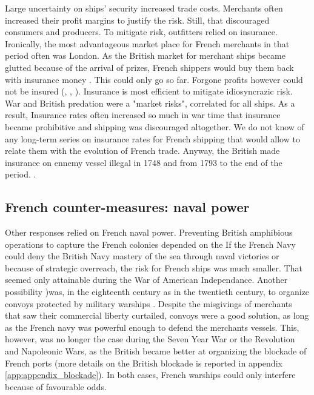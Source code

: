 \documentclass[12pt,a4paper,notitlepage,english]{article}
\begin{document}
Large uncertainty on ships’ security increased trade costs.
Merchants often increased their profit margins to justify the risk.
Still, that discouraged consumers and producers.
To mitigate risk, outfitters relied on insurance.
Ironically, the most advantageous market place for French merchants in that period often was London.
As the British market for merchant ships became glutted because of the arrival of prizes, French shippers would buy them back with insurance money \citep[p. 55]{Tracy1991}. 
This could only go so far.
Forgone profits however could not be insured (\cite[p. 160]{Ducoin1993}, \cite{Villiers2002}, \citep[p. 690-720]{Butel1973}).
Insurance is most efficient to mitigate idiosyncrazic risk.
War and British predation were a "market risks", correlated  for all ships.
As a result, Insurance rates often increased so much in war time that insurance became prohibitive and shipping was discouraged altogether.
We do not know of any long-term series on insurance rates for French shipping that would allow to relate them with the evolution of French trade.
Anyway, the British made insurance on ennemy vessel illegal in 1748 and from 1793 to the end of the period. \citep[p.55]{Tracy1991}.

 \subsection{French counter-measures:  naval power}
 
Other responses relied on French naval power.
Preventing British amphibious operations to capture the French colonies depended on the 
If the French Navy could deny the British Navy mastery of the sea through naval victories or because of strategic overreach, the risk for French ships was much smaller.
That seemed only attainable during the War of American Independance. 
Another possibility )was, in the eighteenth century as in the twentieth century, to organize convoys protected by military warships \cite[p. 393, 407, 448, 641]{Villiers2002}.
Despite the misgivings of merchants that saw their commercial liberty curtailed, convoys were a good solution, as long as the French navy was powerful enough to defend the merchants vessels.
This, however, was no longer the case during the Seven Year War or the Revolution and Napoleonic Wars, as the British became better at organizing the blockade of French ports (more details on the British blockade is reported in appendix \ref{app:appendix_blockade}).
In both cases, French warships could only interfere because of favourable odds.
\end{document}

